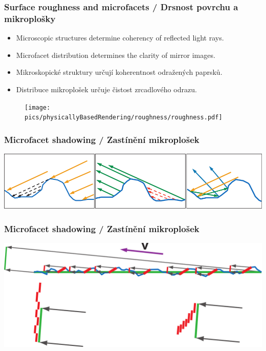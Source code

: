 \begin{frame}\frametitle{Surface roughness and microfacets / Drsnost povrchu a mikroplošky}
  \scriptsize
  \begin{itemize}
    \item Microscopic structures determine coherency of reflected light rays.
    \item Microfacet distribution determines the clarity of mirror images.
  \end{itemize}
  \begin{itemize}
    \item Mikroskopické struktury určují koherentnost odražených paprsků.
    \item Distribuce mikroplošek určuje čistost zrcadlového odrazu.
  \end{itemize}
  \begin{figure}[ht]
    \texttt{[image: pics/physicallyBasedRendering/roughness/roughness.pdf]}
  \end{figure}
\end{frame}

\begin{frame}\frametitle{Microfacet shadowing / Zastínění mikroplošek}
  \includegraphics[width=\textwidth]{pics/physicallyBasedRendering/microfacets_occlusion}
\end{frame}

\begin{frame}\frametitle{Microfacet shadowing / Zastínění mikroplošek}
  \includegraphics[width=\textwidth]{pics/physicallyBasedRendering/microfacet_masking}
\end{frame}

